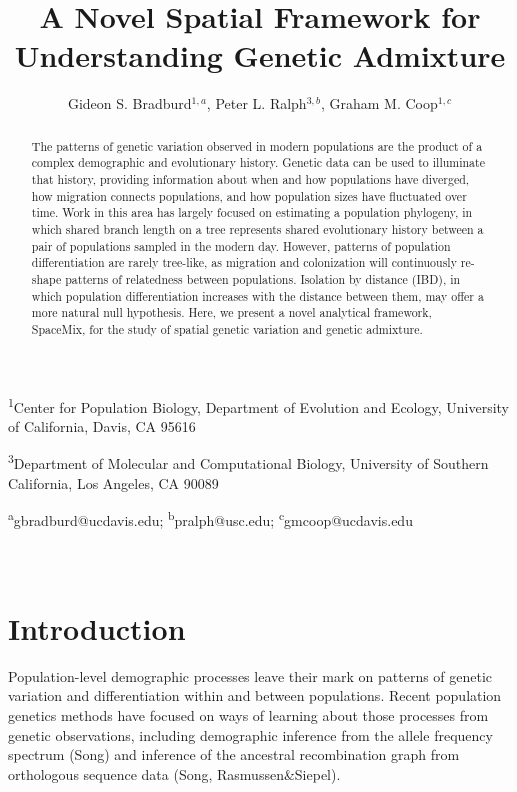 \documentclass[12pt]{article}
\title{A Novel Spatial Framework for Understanding Genetic Admixture}
\date{\vspace{-5ex}}
\author{Gideon S. Bradburd$^{1,a}$, Peter L. Ralph$^{3,b}$, Graham M. Coop$^{1,c}$}
\begin{document}
\maketitle

\textsuperscript{1}Center for Population Biology, Department of Evolution and Ecology, University of California, Davis, CA 95616

\textsuperscript{3}Department of Molecular and Computational Biology, University of Southern California, Los Angeles, CA 90089

\textsuperscript{a}gbradburd@ucdavis.edu; 
\textsuperscript{b}pralph@usc.edu;
\textsuperscript{c}gmcoop@ucdavis.edu\\\\\

\newpage

\begin{abstract}
The patterns of genetic variation observed in modern populations are the product of a complex demographic and evolutionary history.  Genetic data can be used to illuminate that history, providing information about when and how populations have diverged, how migration connects populations, and how population sizes have fluctuated over time.  Work in this area has largely focused on estimating a population phylogeny, in which shared branch length on a tree represents shared evolutionary history between a pair of populations sampled in the modern day.  However, patterns of population differentiation are rarely tree-like, as migration and colonization will continuously re-shape patterns of relatedness between populations.  Isolation by distance (IBD), in which population differentiation increases with the distance between them, may offer a more natural null hypothesis.  Here, we present a novel analytical framework, SpaceMix, for the study of spatial genetic variation and genetic admixture.
\end{abstract}

\newpage
\section*{Introduction}

Population-level demographic processes leave their mark on patterns of genetic variation and differentiation within and between populations.  Recent population genetics methods have focused on ways of learning about those processes from genetic observations, including demographic inference from the allele frequency spectrum (Song) and inference of the ancestral recombination graph from orthologous sequence data (Song, Rasmussen\&Siepel).  
\end{document}
